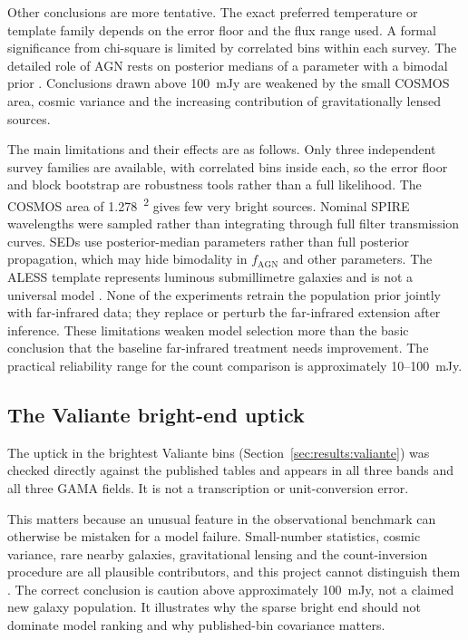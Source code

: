 \documentclass[12pt,a4paper]{article}
\begin{document}
Other conclusions are more tentative. The exact preferred temperature or template family
depends on the error floor and the flux range used. A formal significance from
chi-square is limited by correlated bins within each survey. The detailed role of AGN
rests on posterior medians of a parameter with a bimodal prior
\citep{Thorp_2025_insights}. Conclusions drawn above \SI{100}{mJy} are weakened by the
small COSMOS area, cosmic variance and the increasing contribution of gravitationally
lensed sources.

The main limitations and their effects are as follows. Only three independent survey
families are available, with correlated bins inside each, so the error floor and block
bootstrap are robustness tools rather than a full likelihood. The COSMOS area of
\SI{1.278}{\deg\squared} gives few very bright sources. Nominal SPIRE wavelengths were
sampled rather than integrating through full filter transmission curves. SEDs use
posterior-median parameters rather than full posterior propagation, which may hide
bimodality in $f_\mathrm{AGN}$ and other parameters. The ALESS template represents
luminous submillimetre galaxies and is not a universal model
\citep{Swinbank_2013}. None of the experiments retrain the population prior jointly
with far-infrared data; they replace or perturb the far-infrared extension after
inference. These limitations weaken model selection more than the basic conclusion that
the baseline far-infrared treatment needs improvement. The practical reliability range
for the count comparison is approximately 10--\SI{100}{mJy}.

\subsection{The Valiante bright-end uptick}
\label{sec:discussion:valiante}

The uptick in the brightest Valiante bins (Section~\ref{sec:results:valiante}) was
checked directly against the published tables and appears in all three bands and all
three GAMA fields. It is not a transcription or unit-conversion error.

This matters because an unusual feature in the observational benchmark can otherwise be
mistaken for a model failure. Small-number statistics, cosmic variance, rare nearby
galaxies, gravitational lensing and the count-inversion procedure are all plausible
contributors, and this project cannot distinguish them \citep{Valiante_2016}. The
correct conclusion is caution above approximately \SI{100}{mJy}, not a claimed new
galaxy population. It illustrates why the sparse bright end should not dominate model
ranking and why published-bin covariance matters.
\end{document}
